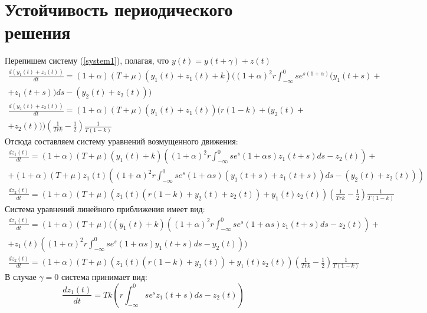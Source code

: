 \documentclass[12pt]{article}
\begin{document}
\section{Устойчивость периодического решения}
Перепишем систему (\ref{system1}), полагая, что $y(t)=y(t+\gamma)+z(t)$
 \begin{multline}
      \label{system1u}
       \frac{d (y_1(t)+z_1 (t))}{d t}=(1+\alpha) (T+\mu )(y_1(t)+z_1(t) +k)( (1+\alpha)^2 r  \int_{-\infty}^{0} s e^{s (1+\alpha)} ( y_1(t+s)+\\+z_1(t+s))d s - (y_2(t) +z_2(t) ))
  \end{multline}
  \begin{multline*}
     \frac{d (y_2(t)+z_2(t))}{d t}=(1+\alpha) (T+\mu)(y_1(t)+z_1(t))( r(1-k) +( y_2(t)+\\+z_2(t)) )\left( \frac{1}{T r k} - \frac{1}{2}\right)\frac{1}{T(1-k)}
  \end{multline*}
  Отсюда составляем систему уравнений возмущенного движения:
  \begin{multline}
      \label{system1z}
       \frac{d z_1 (t)}{d t}=(1+\alpha) (T+\mu )(y_1(t) +k)\left( (1+\alpha)^2 r  \int_{-\infty}^{0} s e^{s}(1+\alpha s)  z_1(t+s)d s -z_2(t) \right)+\\+(1+\alpha) (T+\mu )z_1(t)\left( (1+\alpha)^2 r  \int_{-\infty}^{0} s e^{s}(1+\alpha s) ( y_1(t+s)+z_1(t+s))d s -(y_2(t)+z_2(t)) \right)
  \end{multline}
  \begin{multline*}
     \frac{d z_2(t)}{d t}=(1+\alpha) (T+\mu)(z_1(t)( r(1-k) + y_2(t)+z_2(t))+y_1(t)z_2(t) )\left( \frac{1}{T r k} - \frac{1}{2}\right)\frac{1}{T(1-k)}
  \end{multline*}
  Система уравнений линейного приближения имеет вид:
  \begin{multline}
      \label{system1zl}
       \frac{d z_1 (t)}{d t}=(1+\alpha) (T+\mu )((y_1(t) +k)\left( (1+\alpha)^2 r  \int_{-\infty}^{0} s e^{s}(1+\alpha s)  z_1(t+s)d s -z_2(t) \right)+\\+z_1(t)\left( (1+\alpha)^2 r  \int_{-\infty}^{0} s e^{s}(1+\alpha s)  y_1(t+s)d s -y_2(t) \right))
  \end{multline}
  \begin{multline*}
     \frac{d z_2(t)}{d t}=(1+\alpha) (T+\mu)(z_1(t)( r(1-k) + y_2(t))+y_1(t)z_2(t) )\left( \frac{1}{T r k} - \frac{1}{2}\right)\frac{1}{T(1-k)}
  \end{multline*}
  В случае $\gamma=0$ система принимает вид:
  \begin{equation}
      \frac{d z_1(t)}{d t}=T k (r \int_{-\infty}^{0} s e^{s}z_1(t+s)d s -  z_2 (t) ) 
  \end{equation}
\end{document}
